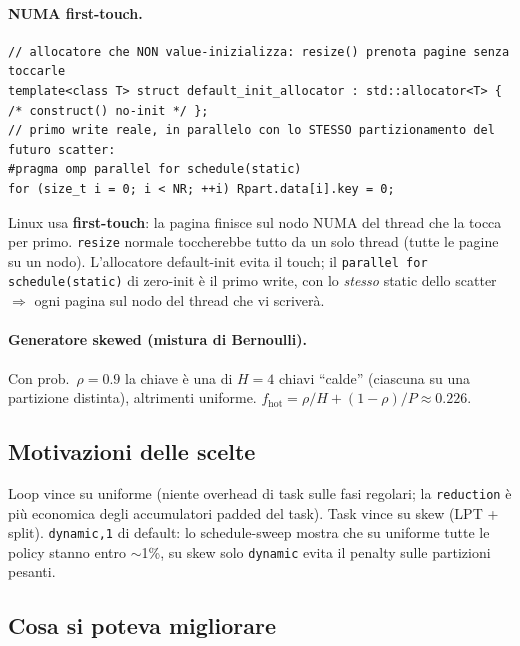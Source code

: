 \documentclass[11pt,a4paper]{article}
\begin{document}
\paragraph{NUMA first-touch.}
\begin{lstlisting}[style=cpp]
// allocatore che NON value-inizializza: resize() prenota pagine senza toccarle
template<class T> struct default_init_allocator : std::allocator<T> { /* construct() no-init */ };
// primo write reale, in parallelo con lo STESSO partizionamento del futuro scatter:
#pragma omp parallel for schedule(static)
for (size_t i = 0; i < NR; ++i) Rpart.data[i].key = 0;
\end{lstlisting}
\begin{whybox}
Linux usa \textbf{first-touch}: la pagina finisce sul nodo NUMA del thread che la tocca per primo. \texttt{resize} normale toccherebbe tutto da un solo thread (tutte le pagine su un nodo). L'allocatore default-init evita il touch; il \texttt{parallel for schedule(static)} di zero-init è il primo write, con lo \emph{stesso} static dello scatter $\Rightarrow$ ogni pagina sul nodo del thread che vi scriverà.
\end{whybox}

\paragraph{Generatore skewed (mistura di Bernoulli).} Con prob.\ $\rho=0.9$ la chiave è una di $H=4$ chiavi ``calde'' (ciascuna su una partizione distinta), altrimenti uniforme. $f_\text{hot}=\rho/H+(1-\rho)/P\approx 0.226$.

\subsection{Motivazioni delle scelte}

Loop vince su uniforme (niente overhead di task sulle fasi regolari; la \texttt{reduction} è più economica degli accumulatori padded del task). Task vince su skew (LPT + split). \texttt{dynamic,1} di default: lo schedule-sweep mostra che su uniforme tutte le policy stanno entro $\sim$1\%, su skew solo \texttt{dynamic} evita il penalty sulle partizioni pesanti.

\subsection{Cosa si poteva migliorare}
\end{document}
